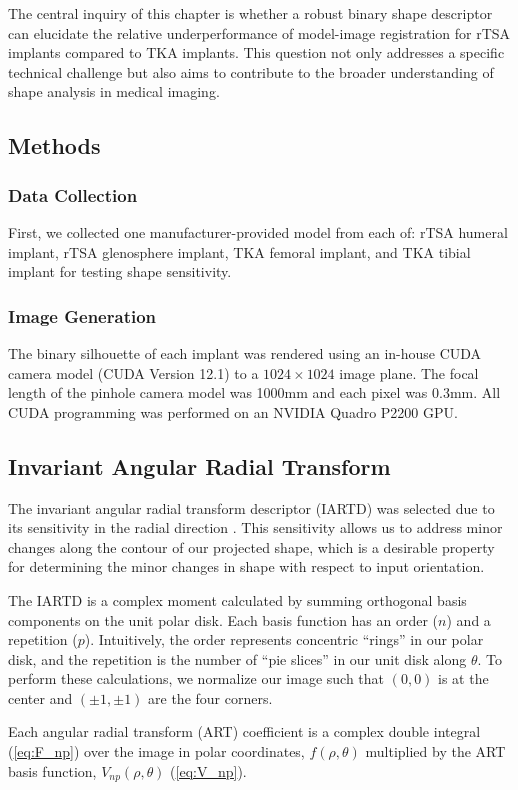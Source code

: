 The central inquiry of this chapter is whether a robust binary shape descriptor can elucidate the relative underperformance of model-image registration for rTSA implants compared to TKA implants. This question not only addresses a specific technical challenge but also aims to contribute to the broader understanding of shape analysis in medical imaging.

\subsection{Methods}
\subsubsection{Data Collection}
First, we collected one manufacturer-provided model from each of: rTSA humeral implant, rTSA glenosphere implant, TKA femoral implant, and TKA tibial implant for testing shape sensitivity.
\subsubsection{Image Generation}
The binary silhouette of each implant was rendered using an in-house CUDA camera model (CUDA Version 12.1) \cite{nickollsScalableParallelProgramming2008} to a $1024\times 1024$ image plane.
The focal length of the pinhole camera model was 1000mm and each pixel was 0.3mm.
All CUDA programming was performed on an NVIDIA Quadro P2200 GPU.
\subsection{Invariant Angular Radial Transform}
The invariant angular radial transform descriptor (IARTD) was selected due to its sensitivity in the radial direction \cite{leeNewShapeDescription2012}.
This sensitivity allows us to address minor changes along the contour of our projected shape, which is a desirable property for determining the minor changes in shape with respect to input orientation.

The IARTD is a complex moment calculated by summing orthogonal basis components on the unit polar disk.
Each basis function has an order ($n$) and a repetition ($p$).
Intuitively, the order represents concentric ``rings'' in our polar disk, and the repetition is the number of ``pie slices'' in our unit disk along $\theta$.
To perform these calculations, we normalize our image such that $(0,0)$ is at the center and $(\pm1,\pm1)$ are the four corners.

Each angular radial transform (ART) coefficient is a complex double integral (\cref{eq:F_np}) over the image in polar coordinates, $f(\rho,\theta)$ multiplied by the ART basis function, $V_{np}(\rho,\theta)$ (\cref{eq:V_np}).

